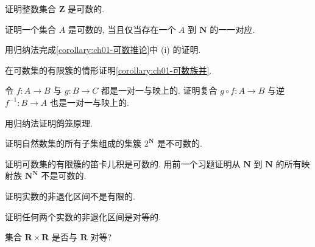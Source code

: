 \documentclass[../../main.tex]{subfiles}
\begin{document}
\begin{exercise}\label{exercise:ch01-16}
证明整数集合 $\mathbf{Z}$ 是可数的.
\end{exercise}

\begin{exercise}\label{exercise:ch01-17}
证明一个集合 $A$ 是可数的, 当且仅当存在一个 $A$ 到 $\mathbf{N}$ 的一一对应.
\end{exercise}

\begin{exercise}\label{exercise:ch01-18}
用归纳法完成\cref{corollary:ch01-可数推论}中 (i) 的证明.
\end{exercise}

\begin{exercise}\label{exercise:ch01-19}
在可数集的有限簇的情形证明\cref{corollary:ch01-可数族并}.
\end{exercise}

\begin{exercise}\label{exercise:ch01-20}
令 $f:A\to B$ 与 $g:B\to C$ 都是一对一与映上的. 证明复合 $g\circ f:A\to B$ 与逆 $f^{-1}:B\to A$ 也是一对一与映上的.
\end{exercise}

\begin{exercise}\label{exercise:ch01-21}
用归纳法证明鸽笼原理.
\end{exercise}

\begin{exercise}\label{exercise:ch01-22}
证明自然数集的所有子集组成的集簇 $2^{\mathbf{N}}$ 是不可数的.
\end{exercise}

\begin{exercise}\label{exercise:ch01-23}
证明可数集的有限簇的笛卡儿积是可数的. 用前一个习题证明从 $\mathbf{N}$ 到 $\mathbf{N}$ 的所有映射族 $\mathbf{N}^{\mathbf{N}}$ 不是可数的.
\end{exercise}

\begin{exercise}\label{exercise:ch01-24}
证明实数的非退化区间不是有限的.
\end{exercise}

\begin{exercise}\label{exercise:ch01-25}
证明任何两个实数的非退化区间是对等的.
\end{exercise}

\begin{exercise}\label{exercise:ch01-26}
集合 $\mathbf{R}\times\mathbf{R}$ 是否与 $\mathbf{R}$ 对等?
\end{exercise}
\end{document}
